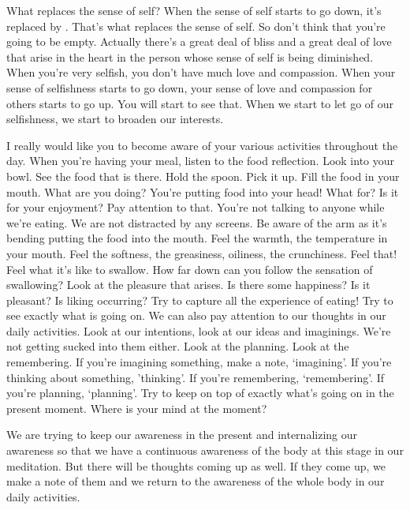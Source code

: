 \documentclass[letterpaper,10pt,english]{sphinxmanual}
\begin{document}
\sphinxAtStartPar
What  replaces  the  sense  of  self? When  the  sense  of  self  starts  to  go
down, it’s replaced by
. That’s what
replaces the sense of self. So don’t think that you’re going to be empty. Actually there’s a great deal of bliss and a great deal of love that arise in the heart
in the person whose sense of self is being diminished. When you’re very selfish, you don’t have much love and compassion. When your sense of selfishness starts to go down, your sense of love and compassion for others starts
to go up. You will start to see that. When we start to let go of our selfishness,
we start to broaden our interests.

\sphinxAtStartPar
I  really  would  like  you  to  become  aware  of  your  various  activities
throughout the day. When you’re having your meal, listen to the food reflection. Look into your bowl. See the food that is there. Hold the spoon. Pick
it up. Fill the food in your mouth. What are you doing? You’re putting food
into  your  head! What  for?  Is  it  for  your  enjoyment?  Pay  attention  to  that.
You’re not talking to anyone while we’re eating. We are not distracted by any
screens. Be aware of the arm as it’s bending putting the food into the mouth.
Feel the warmth, the temperature in your mouth. Feel the softness, the greasiness, oiliness, the crunchiness. Feel that! Feel what it’s like to swallow. How
far down can you follow the sensation of swallowing? Look at the pleasure
that arises. Is there some happiness? Is it pleasant? Is liking occurring? Try
to capture all the experience of eating! Try to see exactly what is going on.
We can also pay attention to our thoughts in our daily activities. Look
  at our intentions, look at our ideas and imaginings. We’re not getting sucked
into them either. Look at the planning. Look at the remembering. If you’re
imagining  something,  make  a  note,  ‘imagining’.  If  you’re  thinking  about
something,  ’thinking’.  If  you’re  remembering,  ‘remembering’.  If  you’re
planning, ‘planning’. Try to keep on top of exactly what’s going on in the
present moment. Where is your mind at the moment?

\sphinxAtStartPar
We are trying to keep our awareness in the present and internalizing
our awareness so that we have a continuous awareness of the body at this
stage  in  our  meditation.  But  there  will  be  thoughts  coming  up  as  well.  If
they come up, we make a note of them and we return to the awareness of the
whole body in our daily activities.
\end{document}

